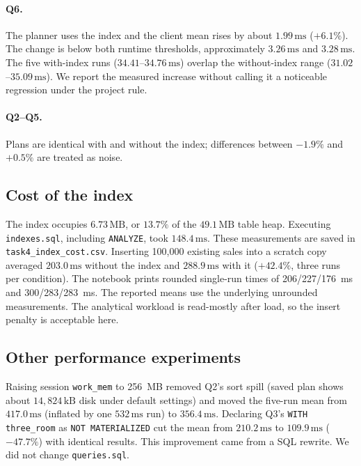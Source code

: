 \paragraph{Q6.}
The planner uses the index and the client mean rises by about $1.99\,\mathrm{ms}$ ($+6.1\%$).
The change is below both runtime thresholds, approximately $3.26\,\mathrm{ms}$ and $3.28\,\mathrm{ms}$.
The five with-index runs ($34.41$--$34.76\,\mathrm{ms}$) overlap the without-index range ($31.02$--$35.09\,\mathrm{ms}$).
We report the measured increase without calling it a noticeable regression under the project rule.

\paragraph{Q2--Q5.}
Plans are identical with and without the index; differences between $-1.9\%$ and $+0.5\%$ are treated as noise.

\subsection{Cost of the index}
The index occupies $6.73\,\mathrm{MB}$, or $13.7\%$ of the $49.1\,\mathrm{MB}$ table heap. Executing \texttt{indexes.sql}, including \texttt{ANALYZE}, took $148.4\,\mathrm{ms}$. These measurements are saved in \texttt{task4\_index\_cost.csv}.
Inserting 100{,}000 existing sales into a scratch copy averaged $203.0\,\mathrm{ms}$ without the index and $288.9\,\mathrm{ms}$ with it ($+42.4\%$, three runs per condition). The notebook prints rounded single-run times of 206/227/176~ms and 300/283/283~ms. The reported means use the underlying unrounded measurements.
The analytical workload is read-mostly after load, so the insert penalty is acceptable here.

\subsection{Other performance experiments}
Raising session \texttt{work\_mem} to 256~MB removed Q2's sort spill (saved plan shows about $14{,}824\,\mathrm{kB}$ disk under default settings) and moved the five-run mean from $417.0\,\mathrm{ms}$ (inflated by one $532\,\mathrm{ms}$ run) to $356.4\,\mathrm{ms}$.
Declaring Q3's \texttt{WITH three\_room} as \texttt{NOT MATERIALIZED} cut the mean from $210.2\,\mathrm{ms}$ to $109.9\,\mathrm{ms}$ ($-47.7\%$) with identical results. This improvement came from a SQL rewrite.
We did not change \texttt{queries.sql}.
